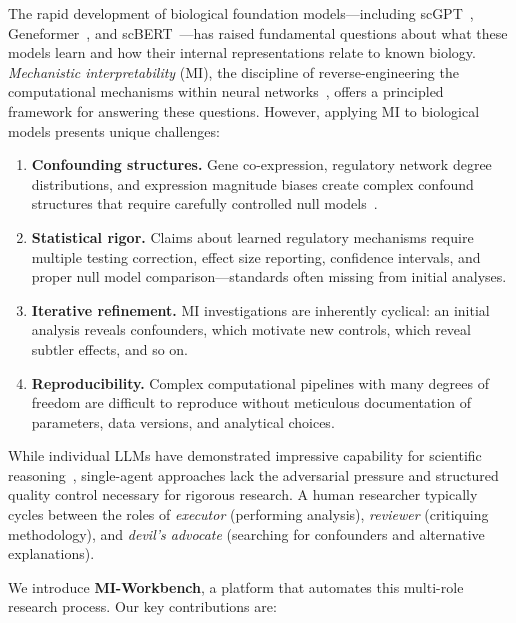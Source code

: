 \documentclass[11pt,a4paper]{article}
\begin{document}
The rapid development of biological foundation models---including scGPT~\citep{cui2024scgpt}, Geneformer~\citep{theodoris2023transfer}, and scBERT~\citep{yang2022scbert}---has raised fundamental questions about what these models learn and how their internal representations relate to known biology.
\emph{Mechanistic interpretability} (MI), the discipline of reverse-engineering the computational mechanisms within neural networks~\citep{olah2020zoom,elhage2022toy,conmy2023towards}, offers a principled framework for answering these questions.
However, applying MI to biological models presents unique challenges:

\begin{enumerate}[leftmargin=*]
  \item \textbf{Confounding structures.} Gene co-expression, regulatory network degree distributions, and expression magnitude biases create complex confound structures that require carefully controlled null models~\citep{pratapa2020benchmarking}.
  \item \textbf{Statistical rigor.} Claims about learned regulatory mechanisms require multiple testing correction, effect size reporting, confidence intervals, and proper null model comparison---standards often missing from initial analyses.
  \item \textbf{Iterative refinement.} MI investigations are inherently cyclical: an initial analysis reveals confounders, which motivate new controls, which reveal subtler effects, and so on.
  \item \textbf{Reproducibility.} Complex computational pipelines with many degrees of freedom are difficult to reproduce without meticulous documentation of parameters, data versions, and analytical choices.
\end{enumerate}

While individual LLMs have demonstrated impressive capability for scientific reasoning~\citep{romera2024mathematical,boiko2023autonomous}, single-agent approaches lack the adversarial pressure and structured quality control necessary for rigorous research.
A human researcher typically cycles between the roles of \emph{executor} (performing analysis), \emph{reviewer} (critiquing methodology), and \emph{devil's advocate} (searching for confounders and alternative explanations).

We introduce \textbf{MI-Workbench}, a platform that automates this multi-role research process.
Our key contributions are:
\end{document}

